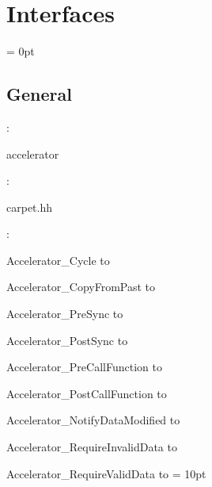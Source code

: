 
\section{Interfaces} 


\parskip = 0pt

\vspace{3mm} \subsection*{General}

: 

accelerator
\vspace{2mm}

\vspace{5mm}

: 

carpet.hh
\vspace{2mm}

: 



Accelerator\_Cycle to 

Accelerator\_CopyFromPast to 

Accelerator\_PreSync to 

Accelerator\_PostSync to 

Accelerator\_PreCallFunction to 

Accelerator\_PostCallFunction to 

Accelerator\_NotifyDataModified to 

Accelerator\_RequireInvalidData to 

Accelerator\_RequireValidData to 
\vspace{2mm}\parskip = 10pt 
